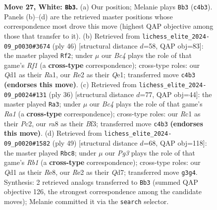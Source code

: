 \documentclass[11pt]{article}
\begin{document}
\begin{figure}[p]
\caption{\textbf{Move 27, White: \texttt{Bb3}.} (a) Our position; Melanie plays \texttt{Bb3} (\texttt{c4b3}). Panels (b)--(d) are the retrieved master positions whose correspondence most drove this move (highest QAP objective among those that transfer to it). (b) Retrieved from \texttt{lichess\_elite\_2024-09\_p0030\#3674} (ply 46) [structural distance $d$=58, QAP obj=83]: the master played \texttt{Rf2}; under $\mu$ our \emph{Bc4} plays the role of that game's \emph{Rf1} (a \textbf{cross-type} correspondence); cross-type roles: our \emph{Q}d1 as their \emph{R}a1, our \emph{R}e2 as their \emph{Q}e1; transferred move \texttt{c4b3} \textbf{(endorses this move)}. (c) Retrieved from \texttt{lichess\_elite\_2024-09\_p0024\#131} (ply 36) [structural distance $d$=77, QAP obj=44]: the master played \texttt{Ra3}; under $\mu$ our \emph{Bc4} plays the role of that game's \emph{Ra1} (a \textbf{cross-type} correspondence); cross-type roles: our \emph{R}c1 as their \emph{P}c2, our \emph{r}a8 as their \emph{B}f3; transferred move \texttt{c4b3} \textbf{(endorses this move)}. (d) Retrieved from \texttt{lichess\_elite\_2024-09\_p0020\#1582} (ply 49) [structural distance $d$=68, QAP obj=118]: the master played \texttt{Rbc8}; under $\mu$ our \emph{Pg3} plays the role of that game's \emph{Rb1} (a \textbf{cross-type} correspondence); cross-type roles: our \emph{Q}d1 as their \emph{R}e8, our \emph{R}e2 as their \emph{Q}d7; transferred move \texttt{g3g4}. Synthesis: 2 retrieved analogs transferred to \texttt{Bb3} (summed QAP objective 126, the strongest correspondence among the candidate moves); Melanie committed it via the \texttt{search} selector.}
\label{fig:thought-m52}
\end{figure}

\clearpage
\end{document}
